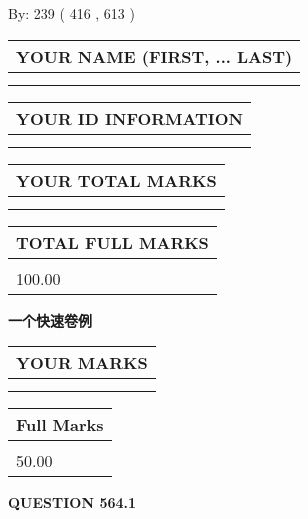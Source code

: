 \documentclass{ctexart}
\begin{document}
   
\hspace{1.0in} By: 
 239 ( 416 ,  613 )
   
   
   
   
\newpage 
\setcounter{page}{ 
   564001 } 
   
   
   
   
\noindent\begin{tabular}{|l|}
\hline
YOUR NAME (FIRST, ... LAST)  \\
\hline
 \\ 
 \\ 
\hline
\end{tabular}
\hspace{0.05in} \begin{tabular}{|l|}
\hline
 YOUR   ID   INFORMATION  \\
\hline
 \\ 
 \\ 
\hline
\end{tabular}
   
   
\vspace{0.2in}\noindent\begin{tabular}{|l|}
\hline
YOUR TOTAL MARKS  \\
\hline
 \\ 
 \\ 
\hline
\end{tabular}
\hspace{0.05in} \begin{tabular}{|l|}
\hline
TOTAL FULL MARKS  \\
\hline
 \\ 
100.00 \\
\hline
\end{tabular}
   
   
 \vspace{0.2in}
{\LARGE {\textbf{ 一个快速卷例}}}
   
   
  
\vspace{0.2in}
  
\noindent\begin{tabular}{|l|}
\hline
 YOUR MARKS  \\
\hline
 \\ 
 \\ 
\hline
\end{tabular}
\hspace{0.05in} \begin{tabular}{|l|}
\hline
 Full Marks  \\
\hline
 \\ 
50.00 \\
\hline
\end{tabular}
{\textbf{\Large{QUESTION
564.1 
}}}
  
\end{document}
